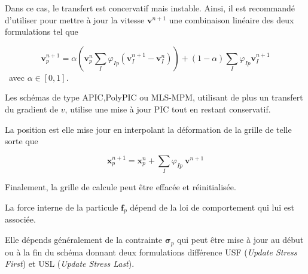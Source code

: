 Dans ce cas, le transfert est concervatif mais instable. Ainsi, il est recommandé d'utiliser pour mettre à jour la vitesse $\bm v^{n+1}$ une combinaison linéaire des deux formulations tel que

\begin{equation*}
    \bm v_{p}^{n+1} = \alpha \left(\bm v_{p}^{n} \sum_I \varphi_{Ip} (\bm v_I^{n+1} - \bm v_I^{n})\right) + (1- \alpha)\sum_I \varphi_{Ip} \bm v_I^{n+1}
\end{equation*}~avec $\alpha \in [0, 1]$.

Les schémas de type APIC,PolyPIC ou MLS-MPM, utilisant de plus un transfert du gradient de $v$, utilise une mise à jour PIC tout en restant conservatif.

La position est elle mise jour en interpolant la déformation de la grille de telle sorte que

\begin{equation*}
    \bm x_p^{n+1} = \bm x_p^{n} + \sum_I \varphi_{Ip}~\bm v^{n+1}
\end{equation*}

Finalement, la grille de calcule peut être effacée et réinitialisée.

La force interne de la particule $\bm f_p$ dépend de la loi de comportement qui lui est associée.

Elle dépends généralement de la contrainte $\bm \sigma_p$ qui peut être mise à jour au début ou à la fin du schéma donnant deux formulations différence USF (\textit{Update Stress First}) et USL (\textit{Update Stress Last}).